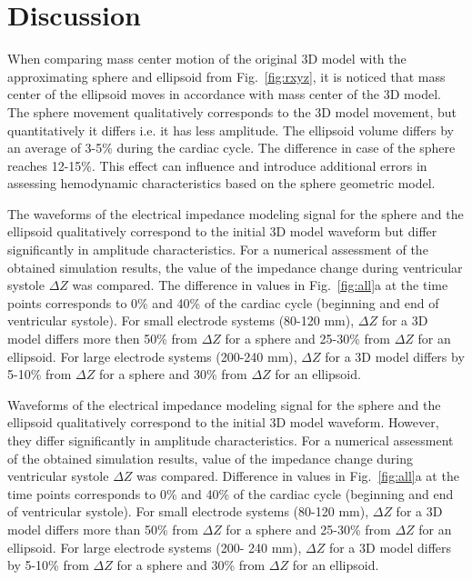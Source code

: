 \documentclass[conference]{IEEEtran}
\begin{document}
\section{Discussion}

When comparing mass center motion of the original 3D model with the approximating sphere and ellipsoid from Fig.~\ref{fig:rxyz},
it is noticed that mass center of the ellipsoid moves in accordance with mass center of the 3D model.
The sphere movement qualitatively corresponds to the 3D model movement, but quantitatively it differs i.e. it has less amplitude.
The ellipsoid volume differs by an average of 3-5\% during the cardiac cycle.
The difference in case of the sphere reaches 12-15\%.
This effect can influence and introduce additional errors in assessing hemodynamic characteristics based on the sphere geometric model.

The waveforms of the electrical impedance modeling signal for the sphere and the
ellipsoid qualitatively correspond to the initial 3D model waveform but differ
significantly in amplitude characteristics. For a numerical assessment of the
obtained simulation results, the value of the impedance change during
ventricular systole $ \Delta Z $ was compared. The difference in values in
Fig.~\ref{fig:all}a at the time points corresponds to 0\% and 40\% of the cardiac
cycle (beginning and end of ventricular systole). For small electrode systems
(80-120 mm), $\Delta Z$ for a 3D model differs more then 50\% from $\Delta Z $ for a
sphere and 25-30\% from $\Delta Z$ for an ellipsoid.
For large electrode systems
(200-240 mm), $\Delta Z$ for a 3D model differs by 5-10\% from $\Delta Z$ for a
sphere and 30\% from $\Delta Z $ for an ellipsoid.%


Waveforms of the electrical impedance modeling signal for the sphere and the ellipsoid qualitatively correspond to the initial 3D model waveform.
However, they differ significantly in amplitude characteristics.
For a numerical assessment of the obtained simulation results, value of the impedance change during ventricular systole $ \Delta Z $ was compared.
Difference in values in Fig.~\ref{fig:all}a at the time points corresponds to 0\% and 40\% of the cardiac cycle (beginning and end of ventricular systole).
For small electrode systems (80-120 mm), $\Delta Z$ for a 3D model differs more than 50\% from $\Delta Z$ for a sphere and 25-30\% from $\Delta Z$ for an ellipsoid.
For large electrode systems (200- 240 mm), $\Delta Z$ for a 3D model differs by 5-10\% from $\Delta Z$ for a sphere and 30\% from $\Delta Z$ for an ellipsoid.
\end{document}
